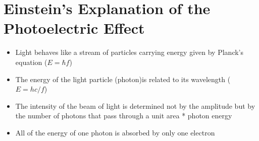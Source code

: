\section{Einstein's Explanation of the Photoelectric Effect}

	\begin{itemize}
		\item Light behaves like a stream of particles carrying energy given by Planck's equation ($E = \hbar f$)
		\item The energy of the light particle (photon)is related to its wavelength ($E = hc/f$)
		\item The intensity of the beam of light is determined not by the amplitude but by the number of photons that pass through a unit area * photon energy
		\item All of the energy of one photon is absorbed by only one electron
	\end{itemize}
